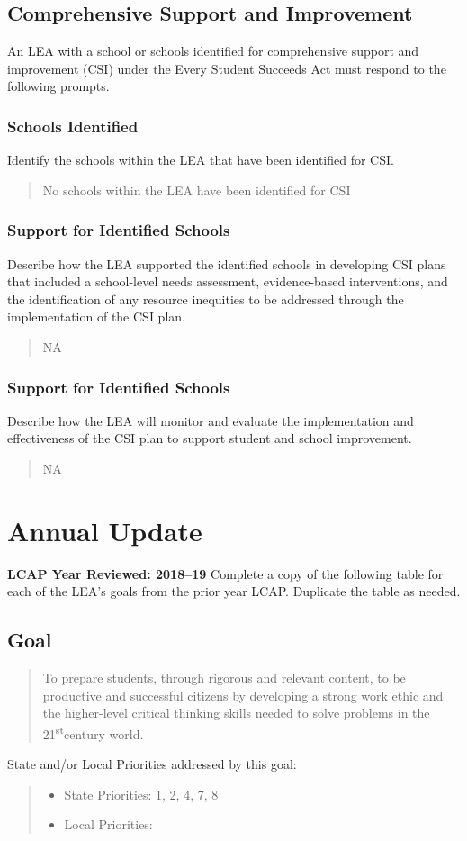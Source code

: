 \documentclass{article}
\newcommand{\st}{\textsuperscript{st}}
\newcounter{goal}[section]
\newcommand{\Goal}[3]{
	\refstepcounter{goal}
	\subsection{Goal \arabic{goal}}
	\begin{quote}
		#1
	\end{quote}
	State and/or Local Priorities addressed by this goal:
	\begin{quote}
		\begin{itemize}[label={}]
		\item State Priorities: #2
		\item Local Priorities: #3
		\end{itemize}
	\end{quote}
}
\begin{document}
\subsection{Comprehensive Support and Improvement}
An LEA with a school or schools identified for comprehensive support and improvement (CSI) under the Every Student Succeeds Act must respond to the following prompts.

\subsubsection{Schools Identified}
Identify the schools within the LEA that have been identified for CSI.
\begin{quote}
	No schools within the LEA have been identified for CSI
\end{quote}

\subsubsection{Support for Identified Schools}
Describe how the LEA supported the identified schools in developing CSI plans that included a school-level needs assessment, evidence-based interventions, and the identification of any resource inequities to be addressed through the implementation of the CSI plan.
\begin{quote}
	NA
\end{quote}

\subsubsection{Support for Identified Schools}
Describe how the LEA will monitor and evaluate the implementation and effectiveness of the CSI plan to support student and school improvement.
\begin{quote}
	NA
\end{quote}

\section{Annual Update}
{\bf LCAP Year Reviewed: 2018--19}\newline
Complete a copy of the following table for each of the LEA's goals from the prior year LCAP. Duplicate the table as needed.

\Goal %
	{To prepare students, through rigorous and relevant content, to be productive and successful citizens by developing a strong work ethic and the higher-level critical thinking skills needed to solve problems in the 21\st century world.}
	{1, 2, 4, 7, 8}
	{}
\end{document}
